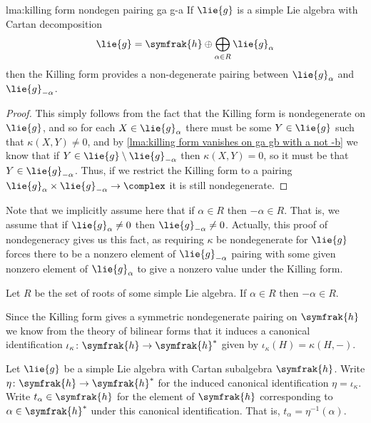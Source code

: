 \documentclass[fleqn]{NotesClass}
\newcommand{\csa}{\symfrak{h}}
\begin{document}
    \begin{lma}{}{lma:killing form nondegen pairing ga g-a}
        If \(\lie{g}\) is a simple Lie algebra with Cartan decomposition
        \begin{equation}
            \lie{g} = \csa \oplus \bigoplus_{\alpha \in R} \lie{g}_{\alpha}
        \end{equation}
        then the Killing form provides a non-degenerate pairing between \(\lie{g}_\alpha\) and \(\lie{g}_{-\alpha}\).
        \begin{proof}
            This simply follows from the fact that the Killing form is nondegenerate on \(\lie{g}\), and so for each \(X \in \lie{g}_\alpha\) there must be some \(Y \in \lie{g}\) such that \(\kappa(X, Y) \ne 0\), and by \cref{lma:killing form vanishes on ga gb with a not -b} we know that if \(Y \in \lie{g} \setminus \lie{g}_{-\alpha}\) then \(\kappa(X, Y) = 0\), so it must be that \(Y \in \lie{g}_{-\alpha}\).
            Thus, if we restrict the Killing form to a pairing \(\lie{g}_\alpha \times \lie{g}_{-\alpha} \to \complex\) it is still nondegenerate.
        \end{proof}
    \end{lma}
    
    Note that we implicitly assume here that if \(\alpha \in R\) then \(-\alpha \in R\).
    That is, we assume that if \(\lie{g}_\alpha \ne 0\) then \(\lie{g}_{-\alpha} \ne 0\).
    Actually, this proof of nondegeneracy gives us this fact, as requiring \(\kappa\) be nondegenerate for \(\lie{g}\) forces there to be a nonzero element of \(\lie{g}_{-\alpha}\) pairing with some given nonzero element of \(\lie{g}_\alpha\) to give a nonzero value under the Killing form.
    
    \begin{crl}{}{}
        Let \(R\) be the set of roots of some simple Lie algebra.
        If \(\alpha \in R\) then \(-\alpha \in R\).
    \end{crl}
    
    Since the Killing form gives a symmetric nondegenerate pairing on \(\csa\) we know from the theory of bilinear forms that it induces a canonical identification \(\iota_\kappa \colon \csa \to \csa^*\) given by \(\iota_\kappa(H) = \kappa(H, -)\).
    
    \begin{dfn}{}{}
        Let \(\lie{g}\) be a simple Lie algebra with Cartan subalgebra \(\csa\).
        Write \(\eta \colon \csa \to \csa^*\) for the induced canonical identification \(\eta = \iota_\kappa\).
        Write \(t_\alpha \in \csa\) for the element of \(\csa\) corresponding to \(\alpha \in \csa^*\) under this canonical identification.
        That is, \(t_\alpha = \eta^{-1}(\alpha)\).
    \end{dfn}
    
\end{document}
